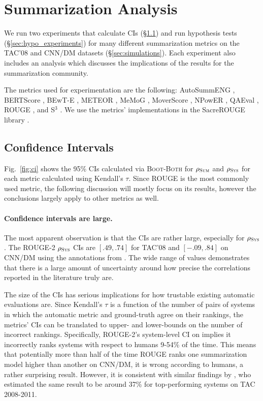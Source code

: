 \section{Summarization Analysis}
We run two experiments that calculate CIs (\S\ref{sec:ci_experiments}) and run hypothesis tests (\S\ref{sec:hypo_experiments}) for many different summarization metrics on the TAC'08 and CNN/DM datasets (\S\ref{sec:simulations}).
Each experiment also includes an analysis which discusses the implications of the results for the summarization community.

The metrics used for experimentation are the following:
AutoSummENG \citep{GKVS08},
BERTScore \citep{ZKWWA20},
BEwT-E \citep{TratzHo08},
METEOR \citep{DenkowskiLa14},
MeMoG \citep{GiannakopoulosKa10},
MoverScore \citep{ZPLGME19},
NPowER \citep{GiannakopoulosKa13},
QAEval \citep{DeutschBeRo20},
ROUGE \citep{Lin04},
and S$^3$ \citep{PeyrardBoGu17}.
We use the metrics' implementations in the SacreROUGE library \citep{DeutschRo20}.

\subsection{Confidence Intervals}
\label{sec:ci_experiments}
Fig.~\ref{fig:ci} shows the 95\% CIs calculated via \textsc{Boot-Both} for $\rho_\textsc{Sum}$ and $\rho_\textsc{Sys}$ for each metric calculated using Kendall's $\tau$.
Since ROUGE is the most commonly used metric, the following discussion will mostly focus on its results, however the conclusions largely apply to other metrics as well.

\paragraph{Confidence intervals are large.}
The most apparent observation is that the CIs are rather large, especially for $\rho_\textsc{Sys}$.
The ROUGE-2 $\rho_\textsc{Sys}$ CIs are $[.49, .74]$ for TAC'08 and $[-.09, .84]$ on CNN/DM using the annotations from \citet{FKMSR21}.
The wide range of values demonstrates that there is a large amount of uncertainty around how precise the correlations reported in the literature truly are.

The size of the CIs has serious implications for how trustable existing automatic evaluations are.
Since Kendall's $\tau$ is a function of the number of pairs of systems in which the automatic metric and ground-truth agree on their rankings, the metrics' CIs can be translated to upper- and lower-bounds on the number of incorrect rankings.
Specifically, ROUGE-2's system-level CI on \citet{FKMSR21} implies it incorrectly ranks systems with respect to humans 9-54\% of the time.
This means that potentially more than half of the time ROUGE ranks one summarization model higher than another on CNN/DM, it is wrong according to humans, a rather surprising result.
However, it is consistent with similar findings by \citet{RCDN13}, who estimated the same result to be around 37\% for top-performing systems on TAC 2008-2011.

